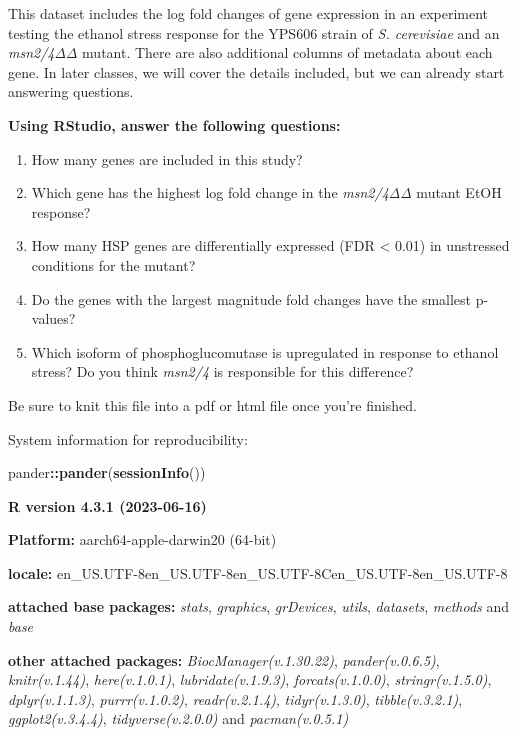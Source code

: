 \documentclass[
]{book}
\newenvironment{Shaded}{\begin{snugshade}}{\end{snugshade}}
\newcommand{\FunctionTok}[1]{\textcolor[rgb]{0.13,0.29,0.53}{\textbf{#1}}}
\newcommand{\NormalTok}[1]{#1}
\newcommand{\SpecialCharTok}[1]{\textcolor[rgb]{0.81,0.36,0.00}{\textbf{#1}}}
\theoremstyle{definition}
\theoremstyle{definition}
\theoremstyle{definition}
\theoremstyle{definition}
\theoremstyle{remark}
\begin{document}
This dataset includes the log fold changes of gene expression in an experiment testing the ethanol stress response for the YPS606 strain of \emph{S. cerevisiae} and an \emph{msn2/4ΔΔ} mutant. There are also additional columns of metadata about each gene. In later classes, we will cover the details included, but we can already start answering questions.

\textbf{Using RStudio, answer the following questions:}

\begin{enumerate}
\def\labelenumi{\arabic{enumi}.}
\item
  How many genes are included in this study?
\item
  Which gene has the highest log fold change in the \emph{msn2/4ΔΔ} mutant EtOH response?
\item
  How many HSP genes are differentially expressed (FDR \textless{} 0.01) in unstressed conditions for the mutant?
\item
  Do the genes with the largest magnitude fold changes have the smallest p-values?
\item
  Which isoform of phosphoglucomutase is upregulated in response to ethanol stress? Do you think \emph{msn2/4} is responsible for this difference?
\end{enumerate}

Be sure to knit this file into a pdf or html file once you're finished.

System information for reproducibility:

\begin{Shaded}
\begin{Highlighting}[]
\NormalTok{pander}\SpecialCharTok{::}\FunctionTok{pander}\NormalTok{(}\FunctionTok{sessionInfo}\NormalTok{())}
\end{Highlighting}
\end{Shaded}

\textbf{R version 4.3.1 (2023-06-16)}

\textbf{Platform:} aarch64-apple-darwin20 (64-bit)

\textbf{locale:}
en\_US.UTF-8\textbar\textbar en\_US.UTF-8\textbar\textbar en\_US.UTF-8\textbar\textbar C\textbar\textbar en\_US.UTF-8\textbar\textbar en\_US.UTF-8

\textbf{attached base packages:}
\emph{stats}, \emph{graphics}, \emph{grDevices}, \emph{utils}, \emph{datasets}, \emph{methods} and \emph{base}

\textbf{other attached packages:}
\emph{BiocManager(v.1.30.22)}, \emph{pander(v.0.6.5)}, \emph{knitr(v.1.44)}, \emph{here(v.1.0.1)}, \emph{lubridate(v.1.9.3)}, \emph{forcats(v.1.0.0)}, \emph{stringr(v.1.5.0)}, \emph{dplyr(v.1.1.3)}, \emph{purrr(v.1.0.2)}, \emph{readr(v.2.1.4)}, \emph{tidyr(v.1.3.0)}, \emph{tibble(v.3.2.1)}, \emph{ggplot2(v.3.4.4)}, \emph{tidyverse(v.2.0.0)} and \emph{pacman(v.0.5.1)}
\end{document}
